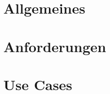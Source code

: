 \documentclass[10pt,a4paper,twoside]{article}
\begin{document}


\tableofcontents
\newpage 
\section{Allgemeines}

\section{Anforderungen}

\section{Use Cases}

\newpage
\appendix
\listoffigures
\listoftables

\newpage
\renewcommand{\refname}{Quellenverzeichnis} 


\end{document}
